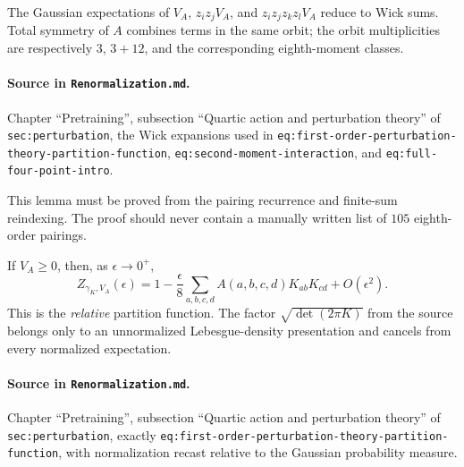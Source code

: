 \begin{lemma}
\label{lem:renorm:quarticMoments}
The Gaussian expectations of $V_A$, $z_i z_jV_A$, and
$z_i z_j z_k z_lV_A$ reduce to Wick sums.  Total symmetry of $A$ combines terms in the same orbit;
the orbit multiplicities are respectively $3$, $3+12$, and the corresponding eighth-moment
classes.

\paragraph{Source in \texttt{Renormalization.md}.}
Chapter ``Pretraining'', subsection ``Quartic action and perturbation theory'' of
\texttt{sec:perturbation}, the Wick expansions used in
\texttt{eq:first-order-perturbation-theory-partition-function},
\texttt{eq:second-moment-interaction}, and \texttt{eq:full-four-point-intro}.
\end{lemma}

This lemma must be proved from the pairing recurrence and finite-sum reindexing.  The proof should
never contain a manually written list of $105$ eighth-order pairings.

\begin{theorem}
\label{thm:renorm:quarticPartition}
If $V_A\geq0$, then, as $\epsilon\to0^+$,
\[
 Z_{\gamma_K,V_A}(\epsilon)
 =1-\frac{\epsilon}{8}\sum_{a,b,c,d}A(a,b,c,d)K_{ab}K_{cd}
  +O(\epsilon^2).
\]
This is the \emph{relative} partition function.  The factor
$\sqrt{\det(2\pi K)}$ from the source belongs only to an unnormalized Lebesgue-density
presentation and cancels from every normalized expectation.

\paragraph{Source in \texttt{Renormalization.md}.}
Chapter ``Pretraining'', subsection ``Quartic action and perturbation theory'' of
\texttt{sec:perturbation}, exactly \texttt{eq:first-order-perturbation-theory-partition-function},
with normalization recast relative to the Gaussian probability measure.
\end{theorem}

